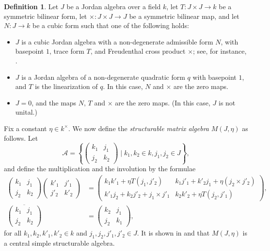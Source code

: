 \documentclass[oneside,a4paper]{amsart} %
\theoremstyle{definition}
\newtheorem{definition}[theorem]{Definition}
\newcommand{\A}{\mathcal{A}}
\numberwithin{equation}{section}
\begin{document}
\begin{definition}
	\label{def:struct matrix}
	Let $J$ be a Jordan algebra over a field $k$, let $T \colon J \times J \rightarrow k$ be a symmetric bilinear form, let $\times \colon J \times J \rightarrow J$ be a symmetric bilinear map, and let $N \colon J \rightarrow k$ be a cubic form such that one of the following holds:
	\begin{itemize}
		\item $J$ is a cubic Jordan algebra with a non-degenerate admissible form $N$, with basepoint $1$, trace form $T$, and Freudenthal cross product $\times$; see, for instance, \cite[$\S$38]{Knus1998}.
		\item $J$ is a Jordan algebra of a non-degenerate quadratic form $q$ with basepoint $1$, and $T$ is the linearization of $q$. In this case, $N$ and $\times$ are the zero maps.
		\item $J = 0$, and the maps $N$, $T$ and $\times$ are the zero maps. (In this case, $J$ is not unital.)
	\end{itemize}
	Fix a constant $\eta \in  k^\times$. 
	We now define the \emph{structurable matrix algebra} $M(J,\eta)$ as follows. 
	Let
	\[
		\A=\left\{ \begin{pmatrix}
			k_1 & j_1 \\ j_2 & k_2
		\end{pmatrix} \mid k_1, k_2\in k, j_1, j_2\in J \right\}, \]
	and define the multiplication and the involution by the formulae
	\begin{align*}
	    \begin{pmatrix}
			k_1 & j_1 \\ j_2 & k_2
		\end{pmatrix}\begin{pmatrix}
			k'_1 & j'_1 \\ j'_2 & k'_2
		\end{pmatrix}
		&= \begin{pmatrix}
			k_1k'_1+\eta T(j_1,j'_2) & k_1j'_1+k'_2j_1+\eta (j_2\times j'_2) \\ k'_1j_2+k_2j'_2+j_1\times j'_1 & k_2k'_2+\eta T(j_2,j'_1)
		\end{pmatrix}, \\
	    \overline{\begin{pmatrix}
			k_1 & j_1 \\ j_2 & k_2
		\end{pmatrix}}
		&= \begin{pmatrix}
			k_2 & j_1 \\ j_2 & k_1
		\end{pmatrix},
	\end{align*}
	for all $k_1, k_2, k'_1,k'_2\in k$ and $j_1, j_2, j'_1, j'_2\in J$. 
	It is shown in \cite[Section 8.v]{Allison1978} and \cite[Section 4]{Allison1984}	 that $M(J,\eta)$ is a central simple structurable algebra.
\end{definition}
\end{document}
